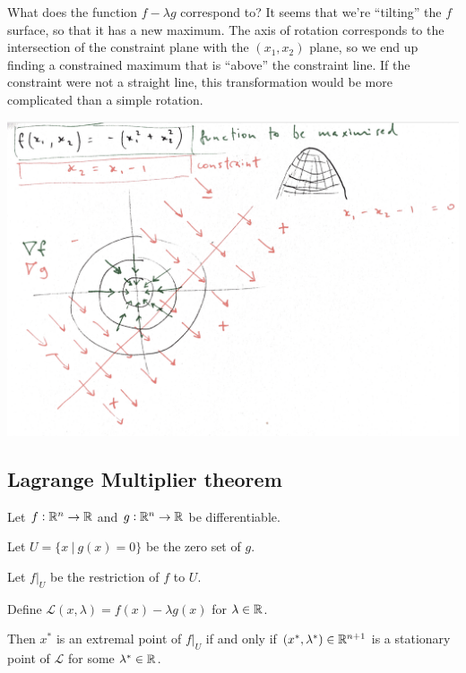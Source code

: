 \begin{intuition}
  What does the function $f - \lambda g$ correspond to? It seems that we're ``tilting'' the $f$ surface, so
  that it has a new maximum. The axis of rotation corresponds to the intersection of the constraint
  plane with the $(x_1, x_2)$ plane, so we end up finding a constrained maximum that is ``above'' the
  constraint line. If the constraint were not a straight line, this transformation would be more
  complicated than a simple rotation.
\begin{mdframed}
\includegraphics[width=400pt]{img/lagrange-multiplier-diag-1.png}
\end{mdframed}

\end{intuition}

\subsection{Lagrange Multiplier theorem}

\begin{theorem*}
  Let $f: \mathbb{R}^n \to \mathbb{R}$ and $g:\mathbb{R}^n \to \mathbb{R}$ be differentiable.

  Let $U = \{x ~|~ g(x) = 0\}$ be the zero set of $g$.

  Let $f|_U$ be the restriction of $f$ to $U$.

  Define $\mathcal{L}(x, \lambda) = f(x) - \lambda g(x)$ for $\lambda \in \mathbb{R}$.

  Then $x^*$ is an extremal point of $f|_U$ if and only if $(x^*, \lambda^*) \in \mathbb{R}^{n+1}$ is a stationary
  point of $\mathcal{L}$ for some $\lambda^* \in \mathbb{R}$.
\end{theorem*}

